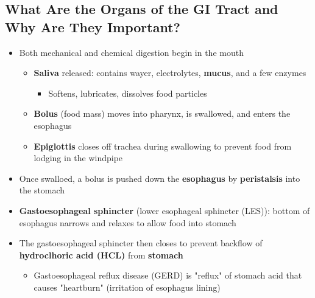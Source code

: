 \documentclass[12pt]{article}
\begin{document}
        \subsection{What Are the Organs of the GI Tract and Why Are They Important?}
            \begin{itemize}
                \item Both mechanical and chemical digestion begin in the mouth
                    \begin{itemize}
                        \item \textbf{Saliva} released: contains wayer, electrolytes, \textbf{mucus}, and a few enzymes
                            \begin{itemize}
                                \item Softens, lubricates, dissolves food particles
                            \end{itemize}
                        \item \textbf{Bolus} (food mass) moves into pharynx, is swallowed, and enters the esophagus
                        \item \textbf{Epiglottis} closes off trachea during swallowing to prevent food from lodging in the windpipe
                    \end{itemize}
                \item Once swalloed, a bolus is pushed down the \textbf{esophagus} by \textbf{peristalsis} into the stomach
                \item \textbf{Gastoesophageal sphincter} (lower esophageal sphincter (LES)): bottom of esophagus narrows and relaxes to allow food into stomach
                \item The gastoesophageal sphincter then closes to prevent backflow of \textbf{hydroclhoric acid (HCL)} from \textbf{stomach}
                    \begin{itemize}
                        \item Gastoesophageal reflux disease (GERD) is "reflux" of stomach acid that causes "heartburn" (irritation of esophagus lining)
                    \end{itemize}
            \end{itemize}
\end{document}
